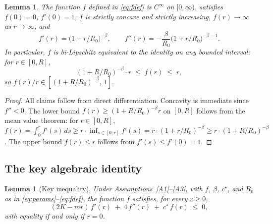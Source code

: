 \documentclass[11pt]{article}
\newtheorem{lemma}[theorem]{Lemma}
\theoremstyle{definition}
\begin{document}
\begin{lemma}\label{lem:f-basic}
The function $f$ defined in \eqref{eq:fdef} is $C^\infty$ on $[0,\infty)$, satisfies $f(0) = 0$, $f'(0) = 1$, $f$ is strictly concave and strictly increasing, $f(r) \to \infty$ as $r \to \infty$, and
\[
f'(r) = \bigl(1 + r/R_0\bigr)^{-\beta}, \qquad f''(r) = -\frac{\beta}{R_0}\bigl(1 + r/R_0\bigr)^{-\beta-1}.
\]
In particular, $f$ is bi-Lipschitz equivalent to the identity on any bounded interval: for $r \in [0, R]$,
\[
(1 + R/R_0)^{-\beta}\cdot r \;\le\; f(r) \;\le\; r,
\]
so $f(r)/r \in [(1 + R/R_0)^{-\beta},\,1]$.
\end{lemma}

\begin{proof}
All claims follow from direct differentiation. Concavity is immediate since $f'' < 0$. The lower bound $f(r) \ge (1 + R/R_0)^{-\beta} r$ on $[0, R]$ follows from the mean value theorem: for $r \in [0, R]$, $f(r) = \int_0^r f'(s)\,ds \ge r\cdot \inf_{s \in [0,r]} f'(s) = r\cdot (1 + r/R_0)^{-\beta} \ge r\cdot (1 + R/R_0)^{-\beta}$. The upper bound $f(r) \le r$ follows from $f'(s) \le f'(0) = 1$.
\end{proof}

\subsection{The key algebraic identity}

\begin{lemma}[Key inequality]\label{lem:key}
Under Assumptions~\ref{A1}--\ref{A3}, with $f$, $\beta$, $c^\star$, and $R_0$ as in \eqref{eq:params}--\eqref{eq:fdef}, the function $f$ satisfies, for every $r \ge 0$,
\begin{equation}\label{eq:key-ineq}
(2K - m r)\, f'(r) \;+\; 4\, f''(r) \;+\; c^\star\, f(r) \;\le\; 0,
\end{equation}
with equality if and only if $r = 0$.
\end{lemma}
\end{document}
